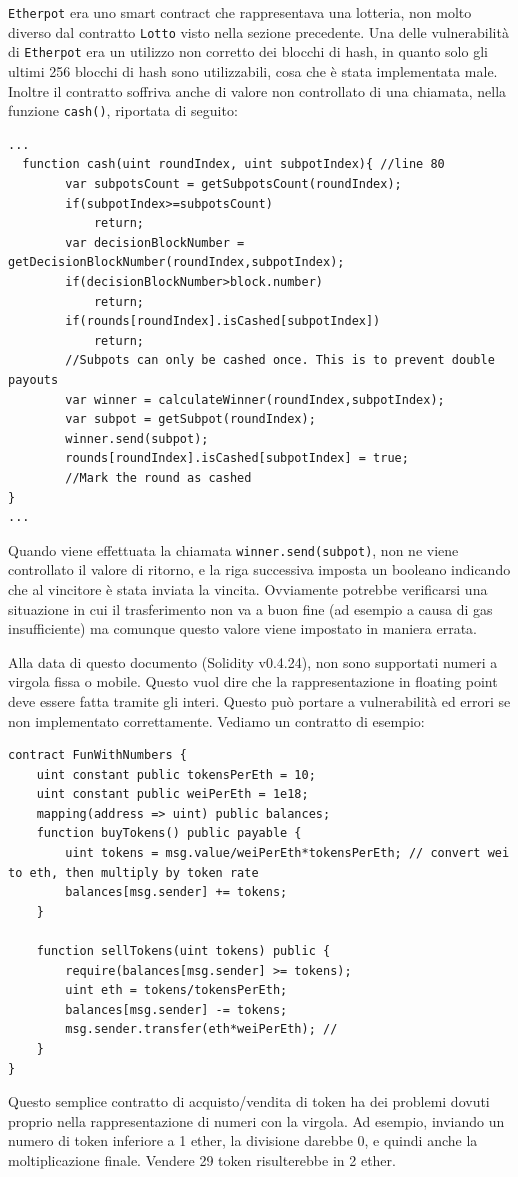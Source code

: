 \vspace{5mm}

\texttt{Etherpot} era uno smart contract che rappresentava una lotteria, non molto diverso dal contratto \texttt{Lotto} visto nella sezione precedente. Una delle vulnerabilità di \texttt{Etherpot} era un utilizzo non corretto dei blocchi di hash, in quanto solo gli ultimi 256 blocchi di hash sono utilizzabili, cosa che è stata implementata male. Inoltre il contratto soffriva anche di valore non controllato di una chiamata, nella funzione \texttt{cash()}, riportata di seguito:
\begin{lstlisting}[language=Solidity]
...
  function cash(uint roundIndex, uint subpotIndex){ //line 80
        var subpotsCount = getSubpotsCount(roundIndex);
        if(subpotIndex>=subpotsCount)
            return;
        var decisionBlockNumber = getDecisionBlockNumber(roundIndex,subpotIndex);
        if(decisionBlockNumber>block.number)
            return;
        if(rounds[roundIndex].isCashed[subpotIndex])
            return;
        //Subpots can only be cashed once. This is to prevent double payouts
        var winner = calculateWinner(roundIndex,subpotIndex);    
        var subpot = getSubpot(roundIndex);
        winner.send(subpot);
        rounds[roundIndex].isCashed[subpotIndex] = true;
        //Mark the round as cashed
}
...
\end{lstlisting}
Quando viene effettuata la chiamata \texttt{winner.send(subpot)}, non ne viene controllato il valore di ritorno, e la riga successiva imposta un booleano indicando che al vincitore è stata inviata la vincita. Ovviamente potrebbe verificarsi una situazione in cui il trasferimento non va a buon fine (ad esempio a causa di gas insufficiente) ma comunque questo valore viene impostato in maniera errata. 

\vspace{5mm}

Alla data di questo documento (Solidity v0.4.24), non sono supportati numeri a virgola fissa o mobile. Questo vuol dire che la rappresentazione in floating point deve essere fatta tramite gli interi. Questo può portare a vulnerabilità ed errori se non implementato correttamente. Vediamo un contratto di esempio:
\begin{lstlisting}[language=Solidity]
contract FunWithNumbers {
    uint constant public tokensPerEth = 10; 
    uint constant public weiPerEth = 1e18;
    mapping(address => uint) public balances;
    function buyTokens() public payable {
        uint tokens = msg.value/weiPerEth*tokensPerEth; // convert wei to eth, then multiply by token rate
        balances[msg.sender] += tokens; 
    }
    
    function sellTokens(uint tokens) public {
        require(balances[msg.sender] >= tokens);
        uint eth = tokens/tokensPerEth; 
        balances[msg.sender] -= tokens;
        msg.sender.transfer(eth*weiPerEth); //
    }
}
\end{lstlisting}
Questo semplice contratto di acquisto/vendita di token ha dei problemi dovuti proprio nella rappresentazione di numeri con la virgola. Ad esempio, inviando un numero di token inferiore a 1 ether, la divisione darebbe 0, e quindi anche la moltiplicazione finale. Vendere 29 token risulterebbe in 2 ether. 

